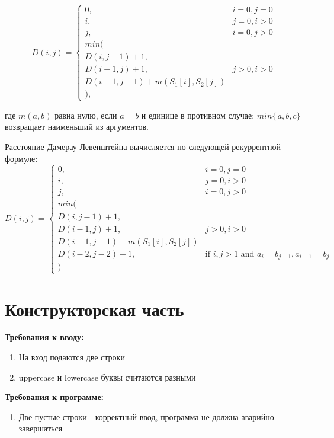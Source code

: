 \documentclass[12pt]{report}
\begin{document}
\begin{displaymath}
D(i,j) = \left\{ \begin{array}{ll}
 0, & \textrm{$i = 0, j = 0$}\\
 i, & \textrm{$j = 0, i > 0$}\\
 j, & \textrm{$i = 0, j > 0$}\\
min(\\
D(i,j-1)+1,\\
D(i-1, j) +1, &\textrm{$j>0, i>0$}\\
D(i-1, j-1) + m(S_{1}[i], S_{2}[j])\\
),
  \end{array} \right.
\end{displaymath}

где $m(a,b)$ равна нулю, если $a=b$ и единице в противном случае; $min\{\,a,b,c\}$ возвращает наименьший из аргументов.

Расстояние Дамерау-Левенштейна вычисляется по следующей рекуррентной формуле:
\begin{displaymath}
D(i,j) = \left\{ \begin{array}{ll}
 0, & \textrm{$i = 0, j = 0$}\\
 i, & \textrm{$j = 0, i > 0$}\\
 j, & \textrm{$i = 0, j > 0$}\\
min(\\
D(i,j-1)+1,\\
D(i-1, j) +1, &\textrm{$j>0, i>0$}\\
D(i-1, j-1) + m(S_{1}[i], S_{2}[j])\\
D(i-2, j-2) + 1, &\textrm{if $i,j>1$ and $a_{i} = b_{j-1},a_{i-1}=b_{j} $}\\
)
  \end{array} \right.
\end{displaymath}



\chapter{Конструкторская часть}
\textbf{Требования к вводу:}
\begin{enumerate}
  	\item На вход подаются две строки
	\item uppercase и lowercase буквы считаются разными
\end{enumerate}
\textbf{Требования к программе:}
\begin{enumerate}
  	\item Две пустые строки - корректный ввод, программа не должна аварийно завершаться
\end{enumerate}
\end{document}
